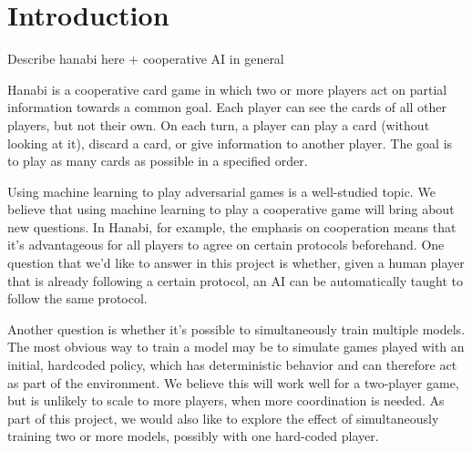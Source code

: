 \section{Introduction}
\label{intro}

Describe hanabi here + cooperative AI in general

Hanabi \cite{hanabiboardgame, hanabiwiki} is a cooperative card game in which two or more players act on partial information towards a common goal. Each player can see the cards of all other players, but not their own. On each turn, a player can play a card (without looking at it), discard a card, or give information to another player. The goal is to play as many cards as possible in a specified order.

Using machine learning to play adversarial games is a well-studied topic. We believe that using machine learning to play a cooperative game will bring about new questions. In Hanabi, for example, the emphasis on cooperation means that it’s advantageous for all players to agree on certain protocols beforehand. One question that we’d like to answer in this project is whether, given a human player that is already following a certain protocol, an AI can be automatically taught to follow the same protocol.

Another question is whether it’s possible to simultaneously train multiple models. The most obvious way to train a model may be to simulate games played with an initial, hardcoded policy, which has deterministic behavior and can therefore act as part of the environment. We believe this will work well for a two-player game, but is unlikely to scale to more players, when more coordination is needed. As part of this project, we would also like to explore the effect of simultaneously training two or more models, possibly with one hard-coded player.
